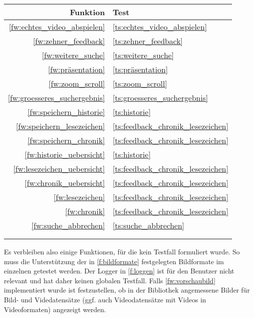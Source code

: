 \begin{minipage}[t]{0.28\textwidth}
\begin{tabular}{r | l}
Funktion & Test \\
\hline
\ref{fw:echtes_video_abspielen} & \ref{ts:echtes_video_abspielen} \\
\ref{fw:zehner_feedback} & \ref{ts:zehner_feedback} \\
\ref{fw:weitere_suche} & \ref{ts:weitere_suche} \\
\ref{fw:präsentation} & \ref{ts:präsentation} \\
\ref{fw:zoom_scroll} & \ref{ts:zoom_scroll} \\
\ref{fw:groesseres_suchergebnis} & \ref{ts:groesseres_suchergebnis} \\
\ref{fw:speichern_historie} & \ref{ts:historie} \\
\ref{fw:speichern_lesezeichen} & \ref{ts:feedback_chronik_lesezeichen} \\
\ref{fw:speichern_chronik} & \ref{ts:feedback_chronik_lesezeichen} \\
\ref{fw:historie_uebersicht} & \ref{ts:historie} \\
\ref{fw:lesezeichen_uebersicht} & \ref{ts:feedback_chronik_lesezeichen} \\
\ref{fw:chronik_uebersicht} & \ref{ts:feedback_chronik_lesezeichen} \\
\ref{fw:lesezeichen} & \ref{ts:feedback_chronik_lesezeichen} \\
\ref{fw:chronik} & \ref{ts:feedback_chronik_lesezeichen} \\
\ref{fw:suche_abbrechen} & \ref{ts:suche_abbrechen} \\
 &  \\
 &  \\
\end{tabular}
\end{minipage}
\label{tab:testueberdeckung}
Es verbleiben also einige Funktionen, für die kein Testfall formuliert wurde.
So muss die Unterstützung der in \ref{f:bildformate} festgelegten Bildformate im einzelnen getestet werden.
Der Logger in \ref{f:loggen} ist für den Benutzer nicht relevant  und hat daher keinen globalen Testfall.
Falls \ref{fw:vorschaubild} implementiert wurde ist festzustellen, ob in der Bibliothek angemessene Bilder für Bild- und Videdatensätze (ggf. auch Videodatensätze mit Videos in Videoformaten) angezeigt werden.

\pagebreak
